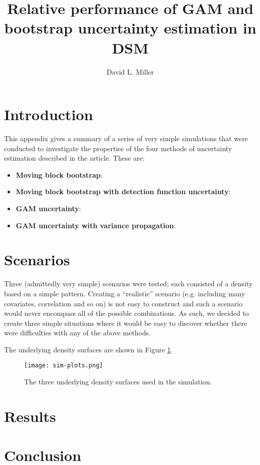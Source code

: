 \documentclass[11pt]{amsart}
\title{Relative performance of GAM and bootstrap uncertainty estimation in DSM}
\author{David L. Miller}
\begin{document}
\maketitle


\section{Introduction}

This appendix gives a summary of a series of very simple simulations that were conducted to investigate the properties of the four methods of uncertainty estimation described in the article. These are:

\begin{itemize}
\item \textbf{Moving block bootstrap}: 
\item \textbf{Moving block bootstrap with detection function uncertainty}: 
\item \textbf{GAM uncertainty}:
\item \textbf{GAM uncertainty with variance propagation}:
\end{itemize}


\section{Scenarios}

Three (admittedly very simple) scenarios were tested; each consisted of a density based on a simple pattern. Creating a ``realistic'' scenario (e.g. including many covariates, correlation and so on) is not easy to construct and such a scenario would never encompass all of the possible combinations. As such, we decided to create three simple situations where it would be easy to discover whether there were difficulties with any of the above methods.

The underlying density surfaces are shown in Figure \ref{sim-plots}.

\begin{figure}[htbp]
\begin{center}
\texttt{[image: sim-plots.png]}
\caption{The three underlying density surfaces used in the simulation.}
\label{sim-plots}
\end{center}
\end{figure}






\section{Results}


\section{Conclusion}





\end{document}

